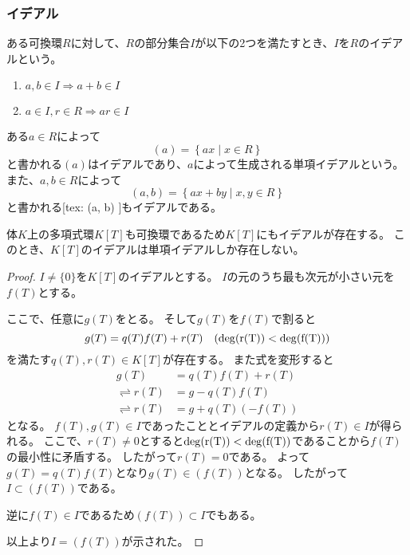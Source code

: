 \documentclass[uplatex, 11pt, a4j, dvipdfmx]{jsarticle}
\begin{document}
  \subsubsection{イデアル}
    \begin{thm}[イデアル]
      ある可換環$R$に対して、$R$の部分集合$I$が以下の2つを満たすとき、$I$を$R$のイデアルという。
      \begin{enumerate}
        \item $a, b \in I \Rightarrow a + b \in I$
        \item $a \in I, r \in R \Rightarrow a r \in I$
      \end{enumerate}
    \end{thm}
    ある$a \in R$によって
    \begin{equation}
     (a) = \left\{ ax \mid x \in R \right\}
    \end{equation}
    と書かれる$(a)$はイデアルであり、$a$によって生成される単項イデアルという。
    また、$a, b \in R$によって
    \begin{equation}
     (a, b) = \left\{ ax + by \mid x, y \in R \right\}
    \end{equation}
    と書かれる[tex: (a, b) ]もイデアルである。

    体$K$上の多項式環$K[T]$も可換環であるため$K[T]$にもイデアルが存在する。
    このとき、$K[T]$のイデアルは単項イデアルしか存在しない。

    \begin{proof}
      $I \neq \{0\}$を$K[T]$のイデアルとする。
      $I$の元のうち最も次元が小さい元を$f(T)$とする。

      ここで、任意に$g(T)$をとる。
      そして$g(T)$を$f(T)$で割ると
      \begin{equation}
        g(T) = q(T) f(T) + r(T) \quad (\rm{deg}(r(T)) < \rm{deg}(f(T)))
      \end{equation}
      を満たす$q(T), r(T) \in K[T]$が存在する。
      また式を変形すると
      \begin{equation} \begin{aligned}
        g(T) &= q(T) f(T) + r(T) \\
        \rightleftharpoons r(T) &= g - q(T) f(T) \\
        \rightleftharpoons r(T) &= g + q(T) (-f(T))
      \end{aligned} \end{equation}
      となる。
      $f(T), g(T) \in I$であったこととイデアルの定義から$r(T) \in I$が得られる。
      ここで、$r(T) \neq 0$とすると$\rm{deg}(r(T)) < \rm{deg}(f(T))$であることから$f(T)$の最小性に矛盾する。
      したがって$r(T) = 0$である。
      よって$g(T) = q(T) f(T)$となり$g(T) \in (f(T))$となる。
      したがって$I \subset (f(T))$である。

      逆に$f(T) \in I$であるため$(f(T)) \subset I$でもある。

      以上より$I = (f(T))$が示された。
    \end{proof}
\end{document}
